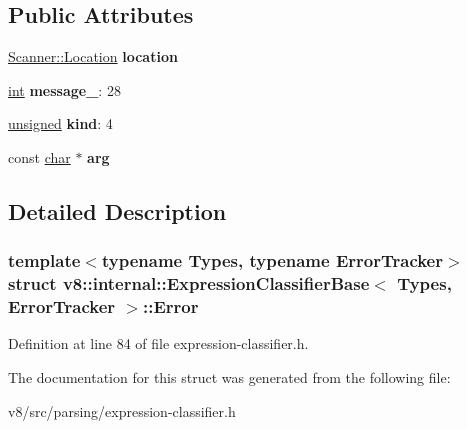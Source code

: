 \subsection*{Public Attributes}
\begin{DoxyCompactItemize}
\item 
\mbox{\label{structv8_1_1internal_1_1ExpressionClassifierBase_1_1Error_af0c223e41493b14c5b8f6b3767231559}} 
\mbox{\hyperlink{structv8_1_1internal_1_1Scanner_1_1Location}{Scanner\+::\+Location}} {\bfseries location}
\item 
\mbox{\label{structv8_1_1internal_1_1ExpressionClassifierBase_1_1Error_a520f8c2f479dc069925bc3fec740d844}} 
\mbox{\hyperlink{classint}{int}} {\bfseries message\+\_\+}\+: 28
\item 
\mbox{\label{structv8_1_1internal_1_1ExpressionClassifierBase_1_1Error_ae26fffb900c3960bc4c7b0ad301b758f}} 
\mbox{\hyperlink{classunsigned}{unsigned}} {\bfseries kind}\+: 4
\item 
\mbox{\label{structv8_1_1internal_1_1ExpressionClassifierBase_1_1Error_a97c3a04daec712d524bb2658e2ad57c7}} 
const \mbox{\hyperlink{classchar}{char}} $\ast$ {\bfseries arg}
\end{DoxyCompactItemize}


\subsection{Detailed Description}
\subsubsection*{template$<$typename Types, typename Error\+Tracker$>$\newline
struct v8\+::internal\+::\+Expression\+Classifier\+Base$<$ Types, Error\+Tracker $>$\+::\+Error}



Definition at line 84 of file expression-\/classifier.\+h.



The documentation for this struct was generated from the following file\+:\begin{DoxyCompactItemize}
\item 
v8/src/parsing/expression-\/classifier.\+h\end{DoxyCompactItemize}
